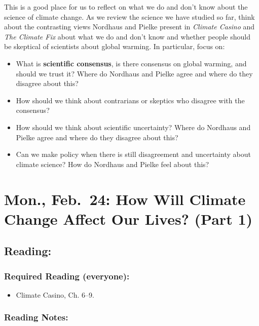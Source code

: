 \documentclass[
]{article}
\providecommand{\tightlist}{%
  \setlength{\itemsep}{0pt}\setlength{\parskip}{0pt}}
\begin{document}
This is a good place for us to reflect on what we do and don't know
about the science of climate change. As we review the science we have
studied so far, think about the contrasting views Nordhaus and Pielke
present in \emph{Climate Casino} and \emph{The Climate Fix} about what
we do and don't know and whether people should be skeptical of
scientists about global warming. In particular, focus on:

\begin{itemize}
\tightlist
\item
  What is \textbf{scientific consensus}, is there consensus on global
  warming, and should we trust it? Where do Nordhaus and Pielke agree
  and where do they disagree about this?
\item
  How should we think about contrarians or skeptics who disagree with
  the consensus?
\item
  How should we think about scientific uncertainty? Where do Nordhaus
  and Pielke agree and where do they disagree about this?
\item
  Can we make policy when there is still disagreement and uncertainty
  about climate science? How do Nordhaus and Pielke feel about this?
\end{itemize}

\hypertarget{mon.-feb.-24-how-will-climate-change-affect-our-lives-part-1}{%
\section{Mon., Feb.~24: How Will Climate Change Affect Our Lives? (Part
1)}\label{mon.-feb.-24-how-will-climate-change-affect-our-lives-part-1}}

\hypertarget{reading-20}{%
\subsection{Reading:}\label{reading-20}}

\hypertarget{required-reading-everyone-15}{%
\subsubsection{Required Reading
(everyone):}\label{required-reading-everyone-15}}

\begin{itemize}
\tightlist
\item
  Climate Casino, Ch. 6--9.
\end{itemize}

\hypertarget{reading-notes-15}{%
\subsubsection{Reading Notes:}\label{reading-notes-15}}
\end{document}
